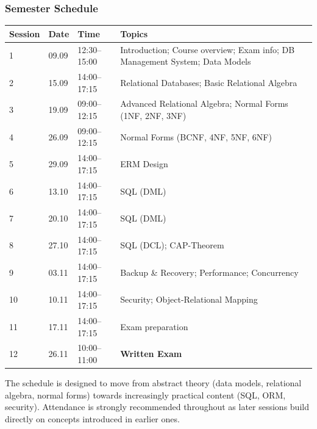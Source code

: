 \begin{frame}
  \frametitle{Semester Schedule}

  \scriptsize
  \begin{tabularx}{\linewidth}{@{}l l l X@{}}
    \toprule
    \textbf{Session} & \textbf{Date} & \textbf{Time} & \textbf{Topics} \\
    \midrule
    1  & 09.09 & 12:30--15:00 & Introduction; Course overview; Exam info; DB Management System; Data Models \\
    2  & 15.09 & 14:00--17:15 & Relational Databases; Basic Relational Algebra \\
    3  & 19.09 & 09:00--12:15 & Advanced Relational Algebra; Normal Forms (1NF, 2NF, 3NF) \\
    4  & 26.09 & 09:00--12:15 & Normal Forms (BCNF, 4NF, 5NF, 6NF) \\
    5  & 29.09 & 14:00--17:15 & ERM Design \\
    6  & 13.10 & 14:00--17:15 & SQL (DML) \\
    7  & 20.10 & 14:00--17:15 & SQL (DML) \\
    8  & 27.10 & 14:00--17:15 & SQL (DCL); CAP-Theorem \\
    9  & 03.11 & 14:00--17:15 & Backup \& Recovery; Performance; Concurrency \\
    10 & 10.11 & 14:00--17:15 & Security; Object-Relational Mapping \\
    11 & 17.11 & 14:00--17:15 & Exam preparation \\
    12 & 26.11 & 10:00--11:00 & \textbf{Written Exam} \\
    \bottomrule
  \end{tabularx}

  \vspace{0.4em}
  \normalsize
  The schedule is designed to move from abstract theory (data models, relational algebra, normal forms) towards increasingly practical content (SQL, ORM, security). Attendance is strongly recommended throughout as later sessions build directly on concepts introduced in earlier ones.
\end{frame}

